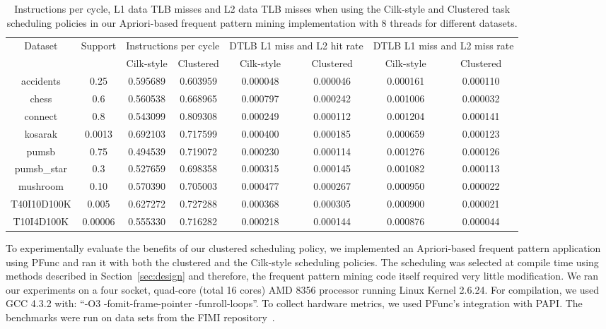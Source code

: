 \documentclass{sig-alternate}
\begin{document}
\begin{table}
\centering
\begin{tabular}{|c|c|c|c|c|c|c|c|}  \hline

\multirow{2}{*}{Dataset} & 
\multirow{2}{*}{Support} & 
\multicolumn{2}{|c|}{Instructions per cycle} &
\multicolumn{2}{|c|}{DTLB L1 miss and L2 hit rate} &
\multicolumn{2}{|c|}{DTLB L1 miss and L2 miss rate} \\ \cline{3-8}
& & Cilk-style & Clustered & 
Cilk-style & Clustered & 
Cilk-style & Clustered \\ 
\hline
accidents & 0.25 &  0.595689 & 0.603959 &
0.000048 & 0.000046 & 0.000161 & 0.000110\\ \hline
chess & 0.6 & 0.560538 & 0.668965 & 
0.000797 & 0.000242 & 0.001006 & 0.000032\\ \hline
connect & 0.8 & 0.543099 & 0.809308 & 
0.000249 & 0.000112 & 0.001204 & 0.000141\\ \hline
kosarak & 0.0013 & 0.692103 & 0.717599 & 
0.000400 & 0.000185 & 0.000659 & 0.000123\\ \hline
pumsb & 0.75 & 0.494539 & 0.719072 & 
0.000230 & 0.000114 & 0.001276 & 0.000126\\ \hline
pumsb\_star & 0.3 & 0.527659 & 0.698358 & 
0.000315 & 0.000145 & 0.001082 & 0.000113\\ \hline
mushroom & 0.10 & 0.570390 & 0.705003 & 
0.000477 &  0.000267 & 0.000950 &0.000022\\ \hline
T40I10D100K & 0.005 & 0.627272 & 0.727288 &
0.000368 & 0.000305 & 0.000900 & 0.000021\\ \hline
T10I4D100K & 0.00006 & 0.555330 & 0.716282 &
0.000218 & 0.000144 & 0.000876 & 0.000044 \\ \hline
\end{tabular}
\caption{Instructions per cycle, L1 data TLB misses and L2 data TLB misses when
using the Cilk-style and Clustered task scheduling policies in our
Apriori-based frequent pattern mining implementation with 8 threads for
different datasets.}
\label{tbl:fim8}
\end{table}

To experimentally evaluate the benefits of our clustered scheduling policy, we
implemented an Apriori-based frequent pattern application using PFunc and ran
it with both the clustered and the Cilk-style scheduling policies. The
scheduling was selected at compile time using methods described in
Section~\ref{sec:design} and therefore, the frequent pattern mining code itself
required very little modification.  We ran our experiments on a four socket,
quad-core (total 16 cores) AMD 8356 processor running Linux Kernel 2.6.24.  For
compilation, we used GCC 4.3.2 with: ``-O3 -fomit-frame-pointer
-funroll-loops''. To collect hardware metrics, we used PFunc's integration with
PAPI.  The benchmarks were run on data sets from the FIMI
repository~\cite{bart:2004}.
\end{document}
